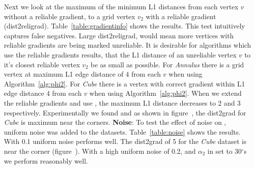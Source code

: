 Next we look at the maximum of the minimum L1 distances from each vertex $v$ without a reliable gradient, to a grid vertex $v_2$ with a reliable gradient (dist2religrad). Table~\ref{table:gradientinfo} shows the results. This test intuitively captures false negatives. Large dist2religrad, would mean more vertices with reliable gradients are being marked unreliable. It is desirable for algorithms which use the reliable gradients results, that the L1 distance of  an unreliable vertex $v$ to it's closest reliable vertex $v_2$ be as small as possible. For \textit{Annulus} there is a grid vertex at maximum L1 edge distance of 4 from each $v$ when using Algorithm~\ref{alg:phi2}. For \textit{Cube} there is a vertex with correct gradient within L1 edge distance 4 from each $v$ when using Algorithm~\ref{alg:phi2}. When we extend the reliable gradients and use \ReliGrad,  the maximum L1 distance decreases to 2 and 3 respectively. Experimentally we found and as shown in  figure~, the dist2grad for \textit{Cube} is maximum near the corners. 
\textbf{Noise}:
To test the effect of noise on \ReliGrad, uniform noise was added to the datasets. Table~\ref{table:noise} shows the results. With 0.1 uniform noise \ReliGrad performs well. The dist2grad of 5 for the \textit{Cube} dataset is near the corner (figure~). With a high uniform noise of 0.2, and $\alpha_{2}$ in \ReliGrad set to 30$^{\circ}$s we perform reasonably well. 
\tiny

